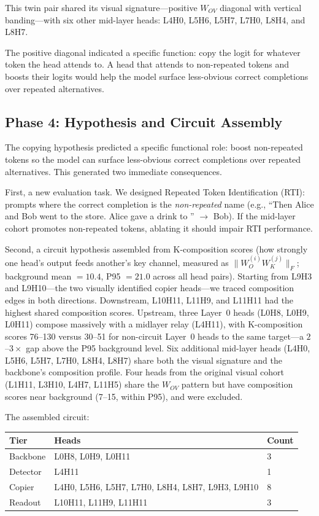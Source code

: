 \documentclass{article}
\begin{document}
This twin pair shared its visual signature---positive $W_{OV}$ diagonal
with vertical banding---with six other mid-layer heads: L4H0, L5H6,
L5H7, L7H0, L8H4, and L8H7.

The positive diagonal indicated a specific function: copy the logit
for whatever token the head attends to. A head that attends to
non-repeated tokens and boosts their logits would help the model
surface less-obvious correct completions over repeated alternatives.

\subsection{Phase 4: Hypothesis and Circuit Assembly}

The copying hypothesis predicted a specific functional role:
boost non-repeated tokens so the model can surface less-obvious
correct completions over repeated alternatives. This generated two
immediate consequences.

First, a new evaluation task. We designed Repeated Token Identification
(RTI): prompts where the correct completion is the \emph{non-repeated}
name (e.g., ``Then Alice and Bob went to the store. Alice gave a drink
to \underline{\phantom{Bob}}'' $\to$ Bob). If the mid-layer cohort
promotes non-repeated tokens, ablating it should impair RTI performance.

Second, a circuit hypothesis assembled from K-composition scores
(how strongly one head's output feeds another's key channel, measured
as $\|W_O^{(i)} W_K^{(j)}\|_F$;
background mean $= 10.4$, P95 $= 21.0$ across all head pairs).
Starting from L9H3 and L9H10---the two visually identified copier
heads---we traced composition edges in both directions. Downstream,
L10H11, L11H9, and L11H11 had the highest shared composition scores.
Upstream, three Layer~0 heads (L0H8, L0H9, L0H11) compose massively
with a midlayer relay (L4H11), with K-composition scores 76--130
versus 30--51 for non-circuit Layer~0 heads to the same target---a
$2$--$3\times$ gap above the P95 background level. Six additional
mid-layer heads (L4H0, L5H6, L5H7, L7H0, L8H4, L8H7) share both the
visual signature and the backbone's composition profile. Four heads
from the original visual cohort (L1H11, L3H10, L4H7, L11H5) share the
$W_{OV}$ pattern but have composition scores near background
(7--15, within P95), and were excluded.

The assembled circuit:
\begin{center}
\begin{tabular}{lll}
\toprule
\textbf{Tier} & \textbf{Heads} & \textbf{Count} \\
\midrule
Backbone & L0H8, L0H9, L0H11 & 3 \\
Detector & L4H11 & 1 \\
Copier & L4H0, L5H6, L5H7, L7H0, L8H4, L8H7, L9H3, L9H10 & 8 \\
Readout & L10H11, L11H9, L11H11 & 3 \\
\bottomrule
\end{tabular}
\end{center}
\end{document}
